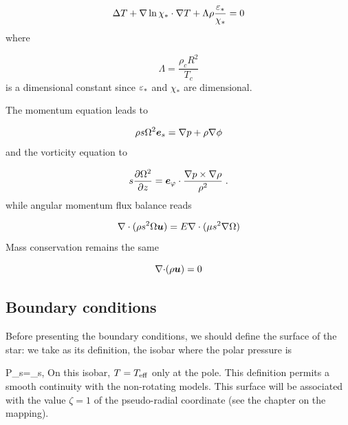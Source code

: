 \begin{equation} \Delta T + \nabla\ln\chi_*\cdot\nabla T +
\Lambda\rho\frac{\varepsilon_*}{\chi_*} = 0\end{equation}
where

\begin{equation} \Lambda = \frac{\rho_c R^2}{T_c}\end{equation}
is a dimensional constant since $\varepsilon_*$ and $\chi_*$ are dimensional. 

The momentum equation leads to

\begin{equation}
\rho s\Omega^2\es=\na p+\rho\na\phi
\label{baroc_nd}
\end{equation}
and the vorticity equation to

\begin{equation}
s\frac{\partial\Omega^2}{\partial z}=\ephi\cdot\frac{\na
p\times\na\rho}{\rho^2} \;.
\label{vort_nd}
\end{equation}
while angular momentum flux balance reads

\begin{equation}
\label{am_nd}
\na\cdot{(\rho s^2\Omega\vu)}=E\na\cdot (\mu s^2\na\Omega)
\end{equation}
Mass conservation remains the same

\begin{equation} \Div(\rho\vu) =0\end{equation}

\subsection{Boundary conditions}

Before presenting the boundary conditions, we should define the surface
of the star: we take as its definition, the isobar where the polar
pressure is 

\beq P_s=\tau_s,\eeq
On this isobar, $T=T_{\rm eff}$ only at the pole. This definition
permits a smooth continuity with the non-rotating models. This surface
will be associated with the value $\zeta=1$ of the pseudo-radial
coordinate (see the chapter on the mapping).


